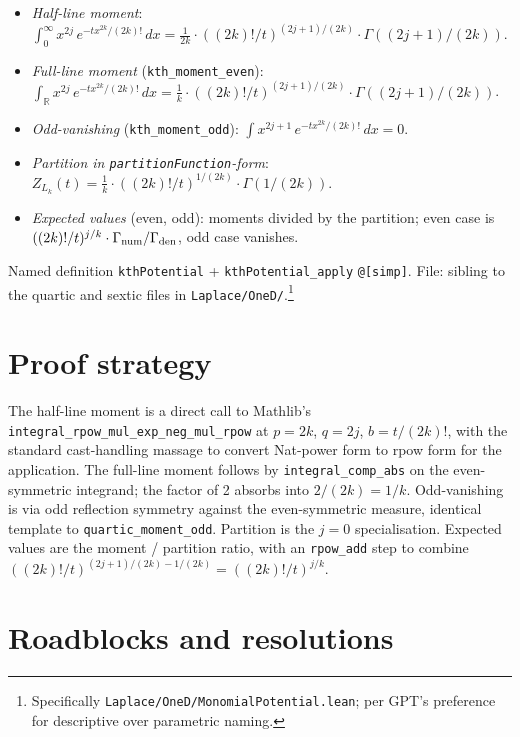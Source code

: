 \documentclass[11pt]{article}
\begin{document}
\begin{itemize}[leftmargin=1.5em]
\item \emph{Half-line moment}: $\int_0^\infty x^{2j}\,e^{-tx^{2k}/(2k)!}\,dx
  = \tfrac{1}{2k}\cdot ((2k)!/t)^{(2j+1)/(2k)}\cdot \Gamma((2j+1)/(2k))$.
\item \emph{Full-line moment} (\texttt{kth\_moment\_even}):
  $\int_{\mathbb R} x^{2j}\,e^{-tx^{2k}/(2k)!}\,dx
  = \tfrac{1}{k}\cdot ((2k)!/t)^{(2j+1)/(2k)}\cdot \Gamma((2j+1)/(2k))$.
\item \emph{Odd-vanishing} (\texttt{kth\_moment\_odd}):
  $\int x^{2j+1}\,e^{-tx^{2k}/(2k)!}\,dx = 0$.
\item \emph{Partition in \texttt{partitionFunction}-form}:
  $Z_{L_k}(t) = \tfrac{1}{k}\cdot ((2k)!/t)^{1/(2k)}\cdot \Gamma(1/(2k))$.
\item \emph{Expected values} (even, odd): moments divided by the
  partition; even case is $((2k)!/t)^{j/k}\cdot
  \Gamma_{\rm num}/\Gamma_{\rm den}$, odd case vanishes.
\end{itemize}

Named definition \texttt{kthPotential} + \texttt{kthPotential\_apply}
\texttt{@[simp]}. File: sibling to the quartic and sextic files in
\texttt{Laplace/OneD/}.\footnote{Specifically
\texttt{Laplace/OneD/MonomialPotential.lean}; per GPT's preference
for descriptive over parametric naming.}

\section{Proof strategy}

The half-line moment is a direct call to Mathlib's
\texttt{integral\_rpow\_mul\_exp\_neg\_mul\_rpow} at $p = 2k$,
$q = 2j$, $b = t/(2k)!$, with the standard cast-handling massage
to convert Nat-power form to rpow form for the application. The
full-line moment follows by \texttt{integral\_comp\_abs} on the
even-symmetric integrand; the factor of 2 absorbs into $2/(2k) =
1/k$. Odd-vanishing is via odd reflection symmetry against the
even-symmetric measure, identical template to
\texttt{quartic\_moment\_odd}. Partition is the $j = 0$
specialisation. Expected values are the moment / partition ratio,
with an \texttt{rpow\_add} step to combine
$((2k)!/t)^{(2j+1)/(2k) - 1/(2k)} = ((2k)!/t)^{j/k}$.

\section{Roadblocks and resolutions}
\end{document}
